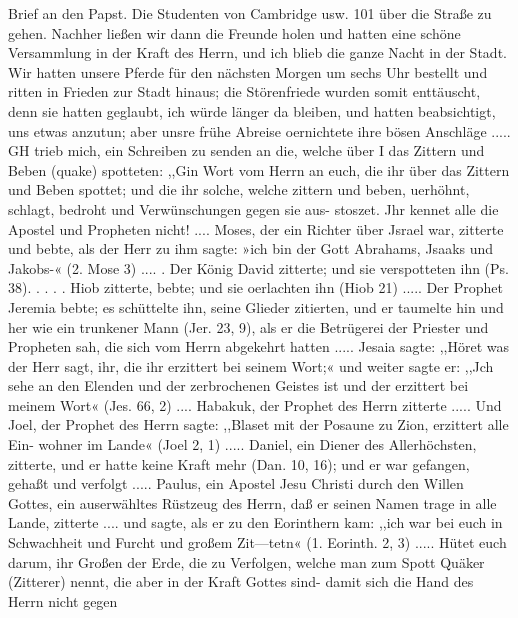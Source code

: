Brief an den Papst. Die Studenten von Cambridge usw. 101
über die Straße zu gehen. Nachher ließen wir dann die Freunde
holen und hatten eine schöne Versammlung in der Kraft des
Herrn, und ich blieb die ganze Nacht in der Stadt. Wir hatten
unsere Pferde für den nächsten Morgen um sechs Uhr bestellt
und ritten in Frieden zur Stadt hinaus; die Störenfriede wurden
somit enttäuscht, denn sie hatten geglaubt, ich würde länger da
bleiben, und hatten beabsichtigt, uns etwas anzutun; aber unsre
frühe Abreise oernichtete ihre bösen Anschläge .....
GH trieb mich, ein Schreiben zu senden an die, welche über
I das Zittern und Beben (quake) spotteten:
,,Gin Wort vom Herrn an euch, die ihr über das Zittern
und Beben spottet; und die ihr solche, welche zittern und beben,
uerhöhnt, schlagt, bedroht und Verwünschungen gegen sie aus-
stoszet. Jhr kennet alle die Apostel und Propheten nicht! ....
Moses, der ein Richter über Jsrael war, zitterte und bebte,
als der Herr zu ihm sagte: »ich bin der Gott Abrahams, Jsaaks
und Jakobs-« (2. Mose 3) .... . Der König David zitterte;
und sie verspotteten ihn (Ps. 38). . . . . Hiob zitterte, bebte;
und sie oerlachten ihn (Hiob 21) ..... Der Prophet Jeremia
bebte; es schüttelte ihn, seine Glieder zitierten, und er taumelte
hin und her wie ein trunkener Mann (Jer. 23, 9), als er die
Betrügerei der Priester und Propheten sah, die sich vom Herrn
abgekehrt hatten ..... Jesaia sagte: ,,Höret was der Herr
sagt, ihr, die ihr erzittert bei seinem Wort;« und weiter sagte er:
,,Jch sehe an den Elenden und der zerbrochenen Geistes ist und
der erzittert bei meinem Wort« (Jes. 66, 2) .... Habakuk, der
Prophet des Herrn zitterte ..... Und Joel, der Prophet des
Herrn sagte: ,,Blaset mit der Posaune zu Zion, erzittert alle Ein-
wohner im Lande« (Joel 2, 1) ..... Daniel, ein Diener des
Allerhöchsten, zitterte, und er hatte keine Kraft mehr (Dan. 10, 16);
und er war gefangen, gehaßt und verfolgt .....
Paulus, ein Apostel Jesu Christi durch den Willen Gottes, ein
auserwähltes Rüstzeug des Herrn, daß er seinen Namen trage in
alle Lande, zitterte .... und sagte, als er zu den Eorinthern
kam: ,,ich war bei euch in Schwachheit und Furcht und großem
Zit—tetn« (1. Eorinth. 2, 3) .....
Hütet euch darum, ihr Großen der Erde, die zu Verfolgen,
welche man zum Spott Quäker (Zitterer) nennt, die aber in der
Kraft Gottes sind- damit sich die Hand des Herrn nicht gegen


